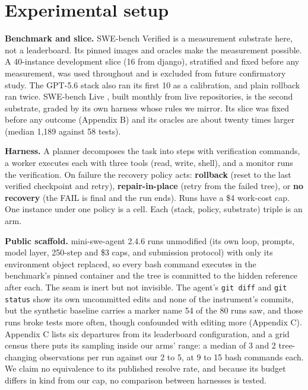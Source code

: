 \documentclass{article}
\begin{document}
\section{Experimental setup}

\textbf{Benchmark and slice.} SWE-bench Verified is a measurement substrate here, not a leaderboard. Its pinned images and oracles make the measurement possible. A 40-instance development slice (16 from django), stratified and fixed before any measurement, was used throughout and is excluded from future confirmatory study. The GPT-5.6 stack also ran its first 10 as a calibration, and plain rollback ran twice. SWE-bench Live \cite{ref3}, built monthly from live repositories, is the second substrate, graded by its own harness whose rules we mirror. Its slice was fixed before any outcome (Appendix B) and its oracles are about twenty times larger (median 1,189 against 58 tests).

\textbf{Harness.} A planner decomposes the task into steps with verification commands, a worker executes each with three tools (read, write, shell), and a monitor runs the verification. On failure the recovery policy acts: \textbf{rollback} (reset to the last verified checkpoint and retry), \textbf{repair-in-place} (retry from the failed tree), or \textbf{no recovery} (the FAIL is final and the run ends). Runs have a \$4 work-cost cap. One instance under one policy is a cell. Each (stack, policy, substrate) triple is an arm.

\textbf{Public scaffold.} mini-swe-agent 2.4.6 \cite{ref12} runs unmodified (its own loop, prompts, model layer, 250-step and \$3 caps, and submission protocol) with only its environment object replaced, so every bash command executes in the benchmark's pinned container and the tree is committed to the hidden reference after each. The seam is inert but not invisible. The agent's \texttt{git diff} and \texttt{git status} show its own uncommitted edits and none of the instrument's commits, but the synthetic baseline carries a marker name 54 of the 80 runs saw, and those runs broke tests more often, though confounded with editing more (Appendix C). Appendix C lists six departures from its leaderboard configuration, and a grid census there puts its sampling inside our arms' range: a median of 3 and 2 tree-changing observations per run against our 2 to 5, at 9 to 15 bash commands each. We claim no equivalence to its published resolve rate, and because its budget differs in kind from our cap, no comparison between harnesses is tested.
\end{document}
